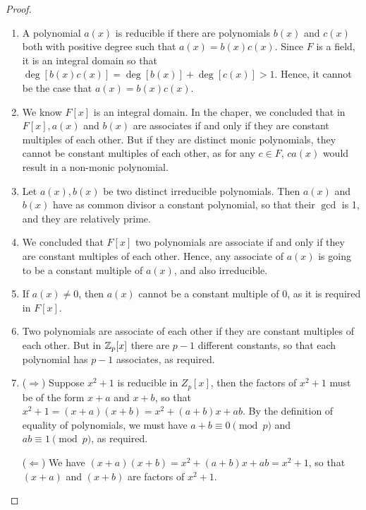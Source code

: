 \begin{proof}
 \begin{enumerate}
    \item A polynomial $a(x)$ is reducible if there are polynomials $b(x)$ and $c(x)$ both with positive degree such that $a(x)=b(x)c(x)$. Since $F$ is a field, it is an integral domain so that $\deg[b(x)c(x)]=\deg[b(x)]+\deg[c(x)]>1$. Hence, it cannot be the case that $a(x)=b(x)c(x)$.
    \item We know $F[x]$ is an integral domain. In the chaper, we concluded that in $F[x], a(x)$ and $b(x)$ are associates if and only if they are constant multiples of each other. But if they are distinct monic polynomials, they cannot be constant multiples of each other, as for any $c\in F$, $ca(x)$ would result in a non-monic polynomial.
    \item  Let $a(x),b(x)$ be two distinct irreducible polynomials. Then $a(x)$ and $b(x)$ have as common divisor a constant polynomial, so that their $\gcd$ is 1, and they are relatively prime.
    \item We concluded that $F[x]$ two polynomials are associate if and only if they are constant multiples of each other. Hence, any associate of $a(x)$ is going to be a constant multiple of $a(x)$, and also irreducible.
    \item If $a(x)\neq 0$, then $a(x)$ cannot be a constant multiple of $0$, as it is required in $F[x]$.
    \item Two polynomials are associate of each other if they are constant multiples of each other. But in $\mathbb{Z}_p[x]$ there are $p-1$ different constants, so that each polynomial has $p-1$ associates, as required.
    \item ($\Rightarrow$) Suppose $x^2+1$ is reducible in $
    Z_p[x]$, then the factors of $x^2+1$ must be of the form $x+a$ and $x+b$, so that $x^2+1=(x+a)(x+b)=x^2+(a+b)x+ab$. By the definition of equality of polynomials, we must have $a+b\equiv 0\pmod{p}$ and $ab\equiv 1\pmod{p}$, as required.

    ($\Leftarrow$) We have $(x+a)(x+b)=x^2+(a+b)x+ab=x^2+1$, so that $(x+a)$ and $(x+b)$ are factors of $x^2+1$.
 \end{enumerate}
\end{proof}

